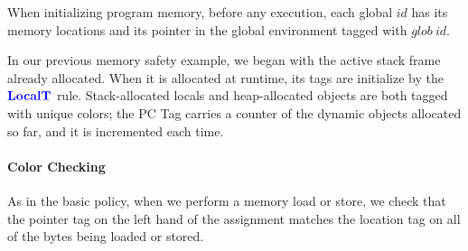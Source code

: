 \documentclass{llncs}
\begin{document}
When initializing program memory, before any execution, each global \(id\) has its
memory locations and its pointer in the global environment tagged with \(\mathit{glob} ~ id\).

In our previous memory safety example, we began with the active stack frame already allocated.
When it is allocated at runtime, its tags are initialize by the \(\color{blue} \mathbf{LocalT}\) rule.
Stack-allocated locals and heap-allocated objects are both tagged with unique colors;
the PC Tag carries a counter of the dynamic objects allocated so far, and it is incremented
each time.


\paragraph*{Color Checking}

As in the basic policy, when we perform a memory load or store, we check that the pointer tag
on the left hand of the assignment matches the location tag on all of the bytes being loaded or stored.

\begin{minipage}{0.49\textwidth}
\end{minipage}
\begin{minipage}{0.49\textwidth}
\end{minipage}
\end{document}
